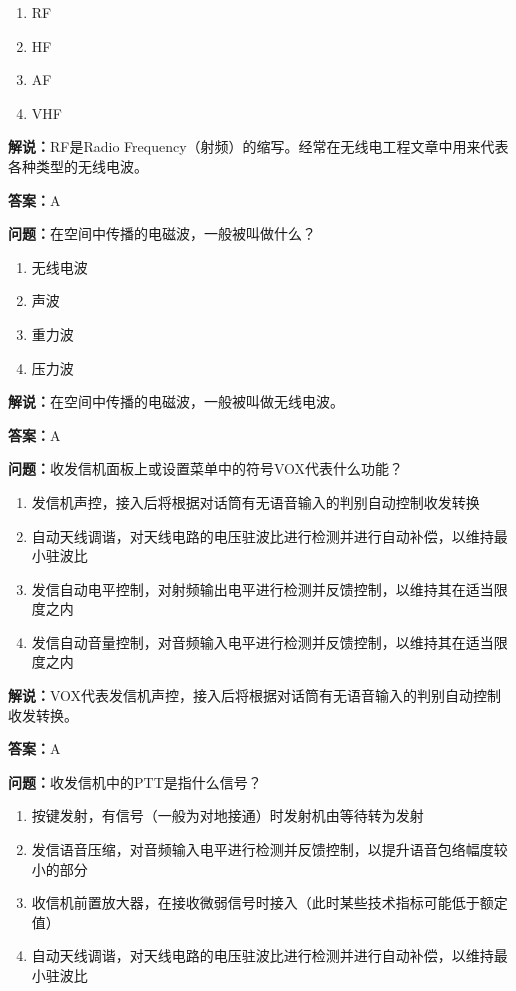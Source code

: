 \documentclass[UTF8]{ctexbook}
\begin{document}
\begin{enumerate}[label=\Alph*), leftmargin=3em]
  \item RF
  \item HF
  \item AF
  \item VHF
\end{enumerate}

\textbf{解说：}RF是Radio Frequency（射频）的缩写。经常在无线电工程文章中用来代表各种类型的无线电波。

\textbf{答案：}A

\textbf{问题：}在空间中传播的电磁波，一般被叫做什么？

\begin{enumerate}[label=\Alph*), leftmargin=3em]
  \item 无线电波
  \item 声波
  \item 重力波
  \item 压力波
\end{enumerate}

\textbf{解说：}在空间中传播的电磁波，一般被叫做无线电波。%

\textbf{答案：}A

\textbf{问题：}收发信机面板上或设置菜单中的符号VOX代表什么功能？

\begin{enumerate}[label=\Alph*), leftmargin=3em]
  \item 发信机声控，接入后将根据对话筒有无语音输入的判别自动控制收发转换
  \item 自动天线调谐，对天线电路的电压驻波比进行检测并进行自动补偿，以维持最小驻波比
  \item 发信自动电平控制，对射频输出电平进行检测并反馈控制，以维持其在适当限度之内
  \item 发信自动音量控制，对音频输入电平进行检测并反馈控制，以维持其在适当限度之内
\end{enumerate}

\textbf{解说：}VOX代表发信机声控，接入后将根据对话筒有无语音输入的判别自动控制收发转换。%

\textbf{答案：}A

\textbf{问题：}收发信机中的PTT是指什么信号？

\begin{enumerate}[label=\Alph*), leftmargin=3em]
  \item 按键发射，有信号（一般为对地接通）时发射机由等待转为发射
  \item 发信语音压缩，对音频输入电平进行检测并反馈控制，以提升语音包络幅度较小的部分
  \item 收信机前置放大器，在接收微弱信号时接入（此时某些技术指标可能低于额定值）
  \item 自动天线调谐，对天线电路的电压驻波比进行检测并进行自动补偿，以维持最小驻波比
\end{enumerate}
\end{document}
